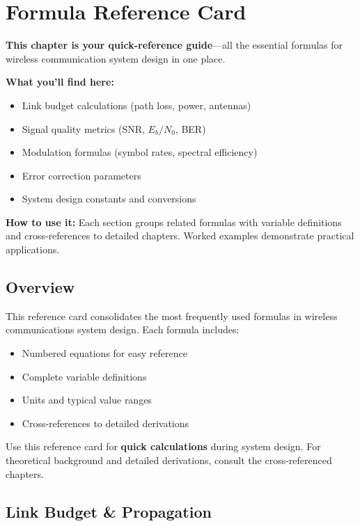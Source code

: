 \chapter{Formula Reference Card}
\label{ch:formula-reference-card}

\begin{nontechnical}
\textbf{This chapter is your quick-reference guide}---all the essential formulas for wireless communication system design in one place.

\textbf{What you'll find here:}
\begin{itemize}
\item Link budget calculations (path loss, power, antennas)
\item Signal quality metrics (SNR, $E_b/N_0$, BER)
\item Modulation formulas (symbol rates, spectral efficiency)
\item Error correction parameters
\item System design constants and conversions
\end{itemize}

\textbf{How to use it:} Each section groups related formulas with variable definitions and cross-references to detailed chapters. Worked examples demonstrate practical applications.
\end{nontechnical}

\section{Overview}

This reference card consolidates the most frequently used formulas in wireless communications system design. Each formula includes:
\begin{itemize}
\item Numbered equations for easy reference
\item Complete variable definitions
\item Units and typical value ranges
\item Cross-references to detailed derivations
\end{itemize}

\begin{keyconcept}
Use this reference card for \textbf{quick calculations} during system design. For theoretical background and detailed derivations, consult the cross-referenced chapters.
\end{keyconcept}

\section{Link Budget \& Propagation}\label{sec:link-budget-propagation}

